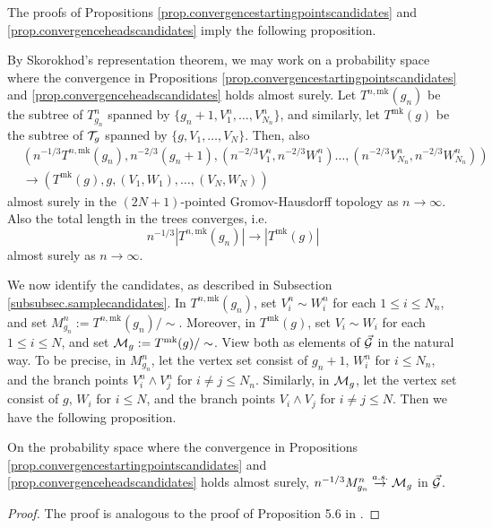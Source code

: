 The proofs of Propositions \ref{prop.convergencestartingpointscandidates} and \ref{prop.convergenceheadscandidates} imply the following proposition.
\begin{proposition}
By Skorokhod's representation theorem, we may work on a probability space where the convergence in Propositions \ref{prop.convergencestartingpointscandidates} and \ref{prop.convergenceheadscandidates} holds almost surely. Let $T^{n,\text{mk}}(g_n)$ be the subtree of $T^n_{g_n}$ spanned by $\{g_n+1,V^n_1,\dots,V^n_{N_n}\}$, and similarly, let $T^{\text{mk}}(g)$ be the subtree of ${\mathcal T}_g$ spanned by $\{g,V_1,\dots,V_N\}$. Then, also 
\begin{align*}
    &\left(n^{-1/3}T^{n,\text{mk}}(g_n), n^{-2/3}(g_n+1), \left(n^{-2/3}V^n_1,n^{-2/3}W^n_1\right) \dots, \left(n^{-2/3}V^n_{N_n}, n^{-2/3}W^n_{N_n}\right)\right)\\
    &\to \left(T^{\text{mk}}(g), g, (V_1,W_1),\dots, (V_{N},W_{N})\right)
\end{align*}
almost surely in the $(2N+1)$-pointed Gromov-Hausdorff topology as $n\to \infty$. Also the total length in the trees converges, i.e.
$$n^{-1/3}\left|T^{n,\text{mk}}(g_n)\right|\to \left| T^{\text{mk}}(g)\right|$$
almost surely as $n\to\infty$.
\end{proposition}
We now identify the candidates, as described in Subsection \ref{subsubsec.samplecandidates}. In $T^{n,\text{mk}}(g_n)$, set $V_i^n\sim W_i^n$ for each $1\leq i\leq N_n$, and set $M^n_{g_n}:=T^{n,\text{mk}}(g_n)/\sim$. Moreover, in $T^{\text{mk}}(g)$, set $V_i\sim W_i$ for each $1\leq i\leq N$, and set ${\mathcal M}_g:=T^{\text{mk}}(g)/\sim$. View both as elements of $\vec{{\mathcal G}}$ in the natural way. To be precise, in  $M^n_{g_n}$, let the vertex set consist of $g_n+1$, $W_i^n$ for $i\leq N_n$, and the branch points $V_i^n\wedge V_j^n$ for $i\neq j\leq N_n$. Similarly, in ${\mathcal M}_g$, let the vertex set consist of $g$, $W_i$ for $i\leq N$, and the branch points $V_i\wedge V_j$ for $i\neq j\leq N$. Then we have the following proposition.
\begin{proposition}
On the probability space where the convergence in Propositions \ref{prop.convergencestartingpointscandidates} and \ref{prop.convergenceheadscandidates} holds almost surely, 
$n^{-1/3}M^n_{g_n}\overset{a.s.}{\to} {\mathcal M}_g$
in $\vec{{\mathcal G}}$.
\end{proposition}
\begin{proof}
The proof is analogous to the proof of Proposition 5.6 in \cite{goldschmidtScalingLimitCritical2021}.
\end{proof}

